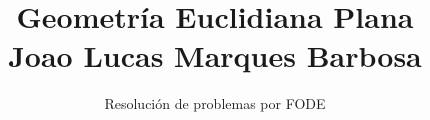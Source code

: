 \normalfont

\author{\Large Resolución de problemas por FODE}
\title{Geometría Euclidiana Plana\\ \small Joao Lucas Marques Barbosa}
\date{}
\pagestyle{empty}
\maketitle
\thispagestyle{empty}
\let\cleardoublepage\clearpage
\tableofcontents								%


 
\let\cleardoublepage\clearpage
